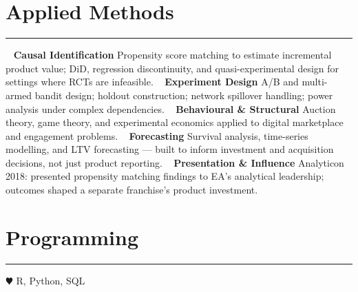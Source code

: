 %
%
%


\vspace{-1.0cm}
\section{\LARGE Applied Methods}
\noindent\rule{\textwidth}{0.4pt}
\vspace{-0.2cm}
~
\textbf{\large Causal Identification}
\faGem Propensity score matching to estimate incremental product value; DiD, regression discontinuity, and quasi-experimental design for settings where RCTs are infeasible.
~
\textbf{\large Experiment Design}
\faGem A/B and multi- armed bandit design; holdout construction; network spillover handling; power analysis under complex dependencies.
~
\textbf{\large Behavioural \& Structural}
\faGem Auction theory, game theory, and experimental economics applied to digital marketplace and engagement problems.
~
\textbf{\large Forecasting}
\faGem Survival analysis, time-series modelling, and LTV forecasting — built to inform investment and acquisition decisions, not just product reporting.
~
\textbf{\large Presentation \& Influence}
\faGem Analyticon 2018: presented propensity matching findings to EA's analytical leadership; outcomes shaped a separate franchise's product investment.
\section{\LARGE Programming}
\noindent\rule{\textwidth}{0.4pt}
{\color{red} $\varheartsuit$} R, Python, SQL
